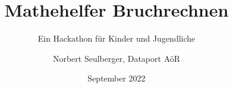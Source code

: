 \documentclass[12p,numbers=noendperiod,DIV=15]{scrartcl}
\begin{document}
	
\title{Mathehelfer Bruchrechnen}
\subtitle{Ein Hackathon für Kinder und Jugendliche}
\author{Norbert Seulberger, Dataport AöR}
\date{September 2022}

\maketitle[-1]

\tableofcontents






%
%


%









\end{document}
